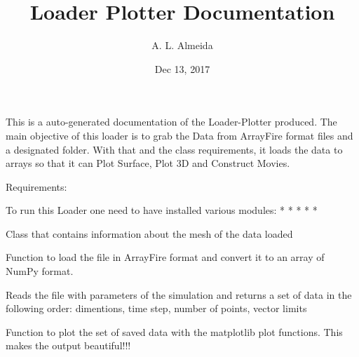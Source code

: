 \documentclass[letterpaper,10pt,english]{sphinxmanual}
\title{Loader Plotter Documentation}
\date{Dec 13, 2017}
\author{A. L. Almeida}
\begin{document}
\maketitle
\sphinxtableofcontents
{}\label{\detokenize{index::doc}}


This is a auto-generated documentation of the Loader-Plotter produced.
The main objective of this loader is to grab the Data from ArrayFire format files and a designated folder. With that and the class requirements, it loads the data to  arrays so that it can Plot Surface, Plot 3D and Construct Movies.

Requirements:

To run this Loader one need to have installed various modules:
* 
* 
* 
* 
* 

\begin{fulllineitems}
\label{\detokenize{index:Loader.meshPlot}}
Class that contains information about the mesh of the data loaded

\begin{fulllineitems}
\label{\detokenize{index:Loader.meshPlot.load_envelope}}
Function to load the file in ArrayFire format and convert it to
an array of NumPy format.

\end{fulllineitems}


\begin{fulllineitems}
\label{\detokenize{index:Loader.meshPlot.load_parameters}}
Reads the file with parameters of the simulation and returns a set
of data in the following order:
dimentions, time step, number of points, vector limits

\end{fulllineitems}


\begin{fulllineitems}
\label{\detokenize{index:Loader.meshPlot.plot_sequence}}
Function to plot the set of saved data with the matplotlib
plot functions. This makes the output beautiful!!!

\end{fulllineitems}


\end{fulllineitems}




\renewcommand{\indexname}{Index}
\printindex
\end{document}
